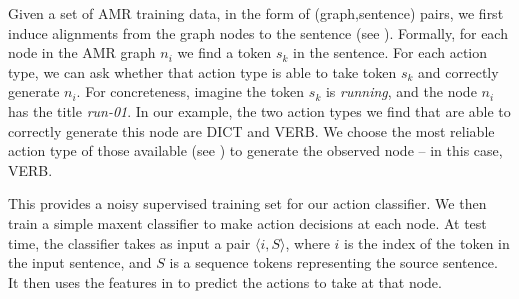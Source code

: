 \documentclass[11pt]{article}
\newcommand\w[1]{\textit{#1}} %
\newcommand\n[1]{\textit{#1}} %
\begin{document}
Given a set of AMR training data, in the form of (graph,sentence) pairs,
  we first induce alignments from the graph nodes to the sentence 
  (see ).
Formally, for each node in the AMR graph $n_i$ we find a token $s_k$ in the
  sentence.
For each action type, we can ask whether that action type is able to take 
  token $s_k$ and correctly generate $n_i$. 
For concreteness, imagine the token $s_k$ is \w{running}, and the node $n_i$ has 
  the title \n{run-01}. 
In our example, the two action types we find that are 
  able to correctly generate this node are DICT and VERB. 
We choose the most reliable action type of those available (see )
  to generate the observed node -- in this case, VERB.
  
This provides a noisy supervised training set for our action classifier.
We then train a simple maxent classifier to make action decisions at each node. 
At test time,
  the classifier takes as input a pair $\langle i, S \rangle$, where $i$ is the 
  index of the token in the input sentence, and $S$ is a sequence tokens 
  representing the source sentence.
It then uses the features in  to predict the actions to take at
  that node.


%
%
%
%
\end{document}
